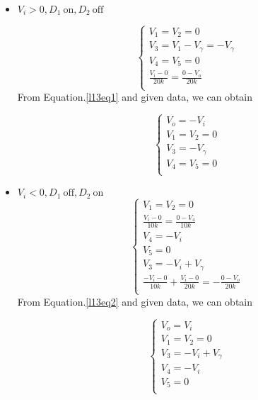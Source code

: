     \begin{itemize}
        \item $V_i > 0, D_1~\text{on}, D_2~\text{off}$\par
            \begin{equation}
                \begin{cases}
                    V_1=V_2=0\\
                    V_3=V_1-V_\gamma=-V_\gamma\\
                    V_4=V_5=0\\
                    \frac{V_i-0}{20k} = \frac{0-V_o}{20k}\\
                \end{cases}
                \label{l13eq1}
            \end{equation}
            From Equation.\ref{l13eq1} and given data, we can obtain\par
            \begin{equation*}
                \begin{cases}
                    V_o=-V_i\\
                    V_1=V_2=0\\
                    V_3=-V_\gamma\\
                    V_4=V_5=0\\
                \end{cases}
            \end{equation*}
            
        \item $V_i < 0, D_1~\text{off}, D_2~\text{on}$
            \begin{equation}
                \begin{cases}
                    V_1=V_2=0\\
                    \frac{V_i-0}{10k}=\frac{0-V_4}{10k}\\
                    V_4=-V_i\\
                    V_5=0\\
                    V_3=-V_i+V_\gamma\\
                    \frac{-V_i-0}{10k}+\frac{V_i-0}{20k}=-\frac{0-V_o}{20k}\\
                \end{cases}
                \label{l13eq2}
            \end{equation}
            From Equation.\ref{l13eq2} and given data, we can obtain\par
            \begin{equation*}
                \begin{cases}
                V_o=V_i\\
                V_1=V_2=0\\
                V_3=-V_i+V_\gamma\\
                V_4=-V_i\\
                V_5=0\\
                \end{cases}
            \end{equation*}
    \end{itemize}

